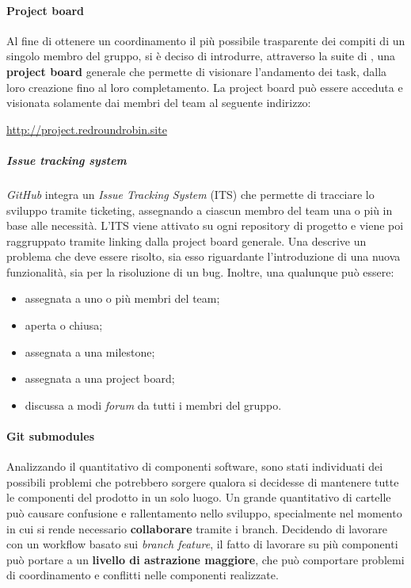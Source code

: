 	\paragraph{Project board}

	Al fine di ottenere un coordinamento il più possibile trasparente dei compiti di un singolo membro del gruppo, si è deciso di introdurre, attraverso la suite di , una \textbf{project board} generale che permette di visionare l'andamento dei task, dalla loro creazione fino al loro completamento.
	La project board può essere acceduta e visionata solamente dai membri del team al seguente indirizzo:

	\href{http://project.redroundrobin.site}{http://project.redroundrobin.site}


		\subparagraph{Issue tracking system}

		\textit{GitHub} integra un \textit{Issue Tracking System} (ITS) che permette di tracciare lo sviluppo tramite ticketing, assegnando a ciascun membro del team una o più  in base alle necessità. L'ITS viene attivato su ogni repository di progetto e viene poi raggruppato tramite linking dalla project board generale. Una  descrive un problema che deve essere risolto, sia esso riguardante l'introduzione di una nuova funzionalità, sia per la risoluzione di un bug. Inoltre, una qualunque  può essere:
		\begin{itemize}
			\item assegnata a uno o più membri del team;
			\item aperta o chiusa;
			\item assegnata a una milestone;
			\item assegnata a una project board;
			\item discussa a modi \textit{forum} da tutti i membri del gruppo.
		\end{itemize}


	\paragraph{Git submodules}

	Analizzando il quantitativo di componenti software, sono stati individuati dei possibili problemi che potrebbero sorgere qualora si decidesse di mantenere tutte le componenti del prodotto in un solo luogo. Un grande quantitativo di cartelle può causare confusione e rallentamento nello sviluppo, specialmente nel momento in cui si rende necessario \textbf{collaborare} tramite i branch. Decidendo di lavorare con un workflow basato sui \textit{branch feature}, il fatto di lavorare su più componenti può portare a un \textbf{livello di astrazione maggiore}, che può comportare problemi di coordinamento e conflitti nelle componenti realizzate.

